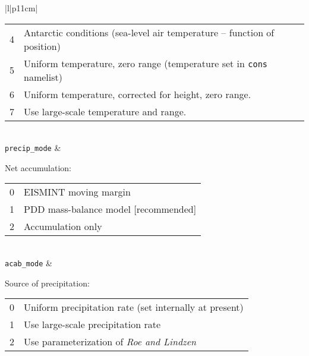 \begin{center}
\begin{supertabular}{|l|p{11cm}|}
{\begin{tabular}{lp{10cm}}
        4 & Antarctic conditions (sea-level air temperature -- function of position)\\
        5 & Uniform temperature, zero range (temperature set in \texttt{cons} namelist) \\
        6 & Uniform temperature, corrected for height, zero range.\\
        7 & Use large-scale temperature and range.\\
      \end{tabular}}\\
    \texttt{precip\_mode} & {\raggedright
      Net accumulation: \\
      \begin{tabular}{lp{10cm}}
        0 & EISMINT moving margin \\
        1 & PDD mass-balance model [recommended] \\
        2 & Accumulation only\\
      \end{tabular}}\\
    \texttt{acab\_mode} & {\raggedright
      Source of precipitation:\\
      \begin{tabular}{lp{7cm}}
        0 & Uniform precipitation rate (set internally at present)\\
        1 & Use large-scale precipitation rate\\
        2 & Use parameterization of \emph{Roe and Lindzen}\\
      \end{tabular}}\\
    \hline
  \end{supertabular}
\end{center}